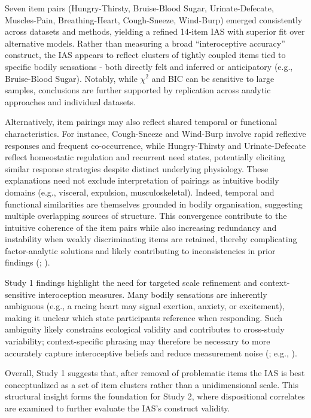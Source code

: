 \documentclass[
  jou,
  floatsintext,
  longtable,
  nolmodern,
  notxfonts,
  notimes,
  colorlinks=true,linkcolor=blue,citecolor=blue,urlcolor=blue]{apa7}
\begin{document}
Seven item pairs (Hungry-Thirsty, Bruise-Blood Sugar, Urinate-Defecate,
Muscles-Pain, Breathing-Heart, Cough-Sneeze, Wind-Burp) emerged
consistently across datasets and methods, yielding a refined 14-item IAS
with superior fit over alternative models. Rather than measuring a broad
``interoceptive accuracy'' construct, the IAS appears to reflect
clusters of tightly coupled items tied to specific bodily sensations -
both directly felt and inferred or anticipatory (e.g., Bruise-Blood
Sugar). Notably, while \(\chi^2\) and BIC can be sensitive to large
samples, conclusions are further supported by replication across
analytic approaches and individual datasets.

Alternatively, item pairings may also reflect shared temporal or
functional characteristics. For instance, Cough-Sneeze and Wind-Burp
involve rapid reflexive responses and frequent co-occurrence, while
Hungry-Thirsty and Urinate-Defecate reflect homeostatic regulation and
recurrent need states, potentially eliciting similar response strategies
despite distinct underlying physiology. These explanations need not
exclude interpretation of pairings as intuitive bodily domains (e.g.,
visceral, expulsion, musculoskeletal). Indeed, temporal and functional
similarities are themselves grounded in bodily organisation, suggesting
multiple overlapping sources of structure. This convergence contribute
to the intuitive coherence of the item pairs while also increasing
redundancy and instability when weakly discriminating items are
retained, thereby complicating factor-analytic solutions and likely
contributing to inconsistencies in prior findings
(;
).

Study 1 findings highlight the need for targeted scale refinement and
context-sensitive interoception measures. Many bodily sensations are
inherently ambiguous (e.g., a racing heart may signal exertion, anxiety,
or excitement), making it unclear which state participants reference
when responding. Such ambiguity likely constrains ecological validity
and contributes to cross-study variability; context-specific phrasing
may therefore be necessary to more accurately capture interoceptive
beliefs and reduce measurement noise
(; e.g.,
).

Overall, Study 1 suggests that, after removal of problematic items the
IAS is best conceptualized as a set of item clusters rather than a
unidimensional scale. This structural insight forms the foundation for
Study 2, where dispositional correlates are examined to further evaluate
the IAS's construct validity.
\end{document}
